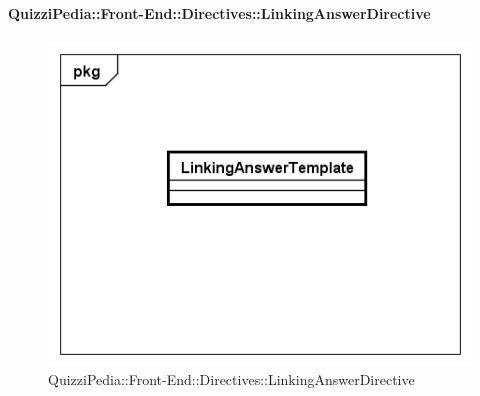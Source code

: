 		\paragraph{QuizziPedia::Front-End::Directives::LinkingAnswerDirective}
		
		\label{QuizziPedia::Front-End::Directives::LinkingAnswerDirective}
		
		\begin{figure}[ht]
			\centering
			\includegraphics[scale=0.5,keepaspectratio]{UML/Classi/Front-End/QuizziPedia_Front-end_Templates_LinkingAnswerTemplate.png}
			\caption{QuizziPedia::Front-End::Directives::LinkingAnswerDirective}
		\end{figure} \FloatBarrier		
		
